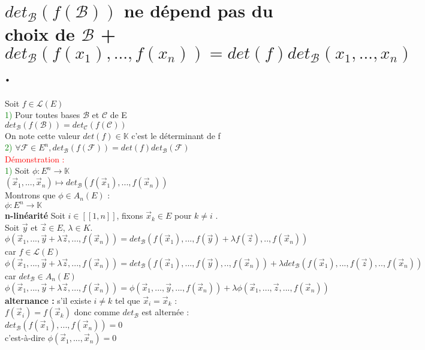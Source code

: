 \documentclass{article}
\begin{document}
	\section{$det_{\mathcal B}(f(\mathcal B))$ ne dépend pas du choix de $\mathcal B$ + $det_{\mathcal B}(f(x_1),...,f(x_n))=det(f)det_{\mathcal B}(x_1,...,x_n) $.}
	Soit $f \in \mathcal L(E)$ \\
\textcolor{green}{1)} Pour toutes bases $\mathcal B$ et $\mathcal C$ de E \\
$det_{\mathcal B}(f(\mathcal B))=det_{\mathcal C}(f(\mathcal C))$ \\
On note cette valeur $det(f) \in \mathbb K$ c'est le déterminant de f \\
\textcolor{green}{2)} $\forall \mathcal F \in E^n,det_{\mathcal B}(f(\mathcal F))=det(f)det_{\mathcal B}(\mathcal F)$ \\
\textcolor{red}{Démonstration :} \\
\textcolor{green}{1)} Soit $\phi : E^n \rightarrow \mathbb K$ \\
\indent $(\vec x_1,...,\vec x_n) \mapsto det_{\mathcal B}(f(\vec x_1),...,f(\vec x_n))$ \\
Montrons que $\phi \in A_n(E)$ : \\
$\phi : E^n \rightarrow \mathbb K$ \\
{\bf n-linéarité }Soit $i \in [[1,n]]$, fixons $\vec x_k \in E$ pour $k\neq i$ . \\
Soit $\vec y$ et $\vec z \in E$, $\lambda \in K$. \\
$\phi(\vec x_1,...,\vec y + \lambda \vec z,...,f(\vec x_n))=det_{\mathcal B}(f(\vec x_1),...,f(\vec y)+ \lambda f(\vec z),..,f(\vec x_n))$ car $f \in \mathcal L(E)$ \\
$\phi(\vec x_1,...,\vec y + \lambda \vec z,...,f(\vec x_n))=det_{\mathcal B}(f(\vec x_1),...,f(\vec y),..,f(\vec x_n))+\lambda det_{\mathcal B}(f(\vec x_1),..., f(\vec z),..,f(\vec x_n))$ car $det_{\mathcal B} \in A_n (E)$ \\
$\phi(\vec x_1,...,\vec y + \lambda \vec z,...,f(\vec x_n))=\phi(\vec x_1,...,\vec y,...,f(\vec x_n))+\lambda \phi(\vec x_1,..., \vec z,...,f(\vec x_n))$ \\
{\bf alternance :} s'il existe $i \neq k$ tel que $\vec x_i= \vec x_k$ : \\
$f(\vec x_i)=f(\vec x_k)$ donc comme $det_{\mathcal B}$ est alternée : \\
$det_{\mathcal B}(f(\vec x_1),...,f(\vec x_n))=0$ \\
c'est-à-dire $\phi(\vec x_1,..., \vec x_n)=0$ \\
\end{document}
